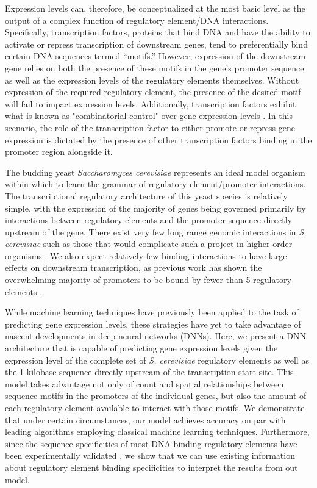 \documentclass{article}
\begin{document}
Expression levels can, therefore, be conceptualized at the most basic level as the output of a complex function of regulatory element/DNA interactions. Specifically, transcription factors, proteins that bind DNA and have the ability to activate or repress transcription of downstream genes, tend to preferentially bind certain DNA sequences termed “motifs.” However, expression of the downstream gene relies on both the presence of these motifs in the gene’s promoter sequence as well as the expression levels of the regulatory elements themselves. Without expression of the required regulatory element, the presence of the desired motif will fail to impact expression levels. Additionally, transcription factors exhibit what is known as "combinatorial control" over gene expression levels \cite{Kato:2004is}. In this scenario, the role of the transcription factor to either promote or repress gene expression is dictated by the presence of other transcription factors binding in the promoter region alongside it.

The budding yeast \textit{Saccharomyces cerevisiae} represents an ideal model organism within which to learn the grammar of regulatory element/promoter interactions. The transcriptional regulatory architecture of this yeast species is relatively simple, with the expression of the majority of genes being governed primarily by interactions between regulatory elements and the promoter sequence directly upstream of the gene. There exist very few long range genomic interactions in \textit{S. cerevisiae} such as those that would complicate such a project in higher-order organisms \cite{Dobi:2007eo}. We also expect relatively few binding interactions to have large effects on downstream transcription, as previous work has shown the overwhelming majority of promoters to be bound by fewer than 5 regulatory elements \cite{Lee:2002jm}.

While machine learning techniques have previously been applied to the task of predicting gene expression levels, these strategies have yet to take advantage of nascent developments in deep neural networks (DNNs). Here, we present a DNN architecture that is capable of predicting gene expression levels given the expression level of the complete set of \textit{S. cerevisiae} regulatory elements as well as the 1 kilobase sequence directly upstream of the transcription start site. This model takes advantage not only of count and spatial relationships between sequence motifs in the promoters of the individual genes, but also the amount of each regulatory element available to interact with those motifs. We demonstrate that under certain circumstances, our model achieves accuracy on par with leading algorithms employing classical machine learning techniques. Furthermore, since the sequence specificities of most DNA-binding regulatory elements have been experimentally validated \cite{deBoer:2011ic}, we show that we can use existing information about regulatory element binding specificities to interpret the results from out model.
\end{document}
